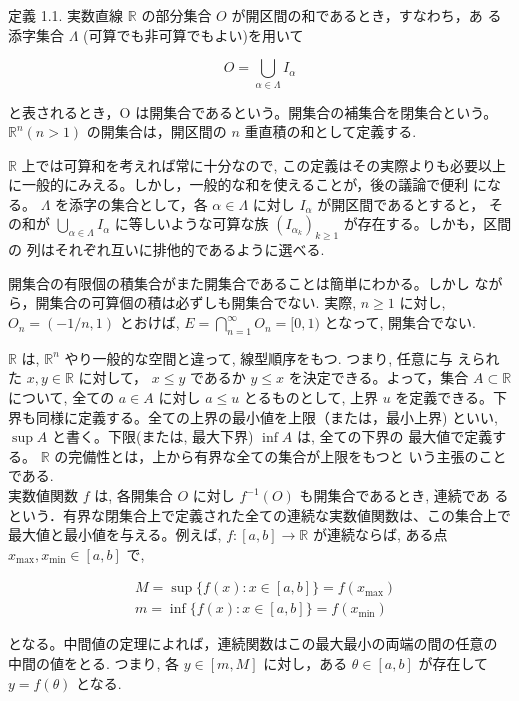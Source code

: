 \documentclass[14pt]{jsarticle}
\begin{document}
定義 1.1. 実数直線 $\mathbb{R}$ の部分集合 $O$ が開区間の和であるとき，すなわち，あ る添字集合 $\Lambda$ (可算でも非可算でもよい)を用いて

$$
O=\bigcup_{\alpha \in \Lambda} I_{\alpha}
$$

と表されるとき，O は開集合であるという。開集合の補集合を閉集合という。 $\mathbb{R}^{n}(n>1)$ の開集合は，開区間の $n$ 重直積の和として定義する.

$\mathbb{R}$ 上では可算和を考えれば常に十分なので, この定義はその実際よりも必要以上に一般的にみえる。しかし，一般的な和を使えることが，後の議論で便利 になる。 $\Lambda$ を添字の集合として，各 $\alpha \in \Lambda$ に対し $I_{\alpha}$ が開区間であるとすると， その和が $\bigcup_{\alpha \in \Lambda} I_{\alpha}$ に等しいような可算な族 $\left(I_{\alpha_{k}}\right)_{k \geq 1}$ が存在する。しかも，区間の 列はそれぞれ互いに排他的であるように選べる.

開集合の有限個の積集合がまた開集合であることは簡単にわかる。しかし ながら，開集合の可算個の積は必ずしも開集合でない. 実際, $n \geq 1$ に対し, $O_{n}=(-1 / n, 1)$ とおけば, $E=\bigcap_{n=1}^{\infty} O_{n}=[0,1)$ となって, 開集合でない.

$\mathbb{R}$ は, $\mathbb{R}^{n}$ やり一般的な空間と違って, 線型順序をもつ. つまり, 任意に与 えられた $x, y \in \mathbb{R}$ に対して， $x \leq y$ であるか $y \leq x$ を決定できる。よって，集合 $A \subset \mathbb{R}$ について, 全ての $a \in A$ に対し $a \leq u$ とるものとして, 上界 $u$ を定義できる。下界も同様に定義する。全ての上界の最小値を上限（または，最小上界) といい, $\sup A$ と書く。下限(または, 最大下界) $\inf A$ は, 全ての下界の 最大値で定義する。 $\mathbb{R}$ の完備性とは，上から有界な全ての集合が上限をもつと いう主張のことである.\\
実数値関数 $f$ は, 各開集合 $O$ に対し $f^{-1}(O)$ も開集合であるとき, 連続であ るという．有界な閉集合上で定義された全ての連続な実数値関数は、この集合上で最大値と最小値を与える。例えば, $f:[a, b] \rightarrow \mathbb{R}$ が連続ならば, ある点 $x_{\max }, x_{\min } \in[a, b]$ で,

$$
\begin{aligned}
& M=\sup \{f(x): x \in[a, b]\}=f\left(x_{\max }\right) \\
& m=\inf \{f(x): x \in[a, b]\}=f\left(x_{\min }\right)
\end{aligned}
$$

となる。中間値の定理によれば，連続関数はこの最大最小の両端の間の任意の 中間の値をとる. つまり, 各 $y \in[m, M]$ に対し，ある $\theta \in[a, b]$ が存在して $y=f(\theta)$ となる.
\end{document}
